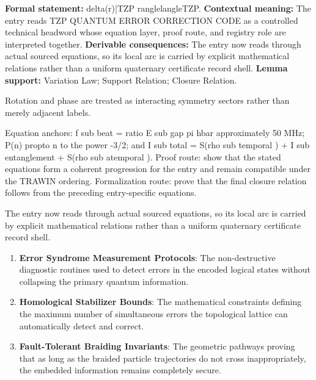 \begingroup\footnotesize\setlength{\emergencystretch}{3em}\sloppy
\textbf{Formal statement:} delta(r)|TZP ranglelangleTZP. \textbf{Contextual meaning:} The entry reads TZP QUANTUM ERROR CORRECTION CODE as a controlled technical headword whose equation layer, proof route, and registry role are interpreted together. \textbf{Derivable consequences:} The entry now reads through actual sourced equations, so its local arc is carried by explicit mathematical relations rather than a uniform quaternary certificate record shell. \textbf{Lemma support:} Variation Law; Support Relation; Closure Relation.\par
\endgroup

Rotation and phase are treated as interacting symmetry sectors rather than merely adjacent labels.

Equation anchors: f sub beat = ratio E sub gap pi hbar approximately 50 MHz; P(n) propto n to the power -3/2; and I sub total = S(rho sub temporal ) + I sub entanglement + S(rho sub atemporal ). Proof route: show that the stated equations form a coherent progression for the entry and remain compatible under the TRAWIN ordering. Formalization route: prove that the final closure relation follows from the preceding entry-specific equations.

The entry now reads through actual sourced equations, so its local arc is carried by explicit mathematical relations rather than a uniform quaternary certificate record shell.
\endgroup

\begin{enumerate}[leftmargin=1.6em,itemsep=6pt,topsep=4pt]
\item \textbf{Error Syndrome Measurement Protocols}: The non-destructive diagnostic routines used to detect errors in the encoded logical states without collapsing the primary quantum information.
\item \textbf{Homological Stabilizer Bounds}: The mathematical constraints defining the maximum number of simultaneous errors the topological lattice can automatically detect and correct.
\item \textbf{Fault-Tolerant Braiding Invariants}: The geometric pathways proving that as long as the braided particle trajectories do not cross inappropriately, the embedded information remains completely secure.
\end{enumerate}


